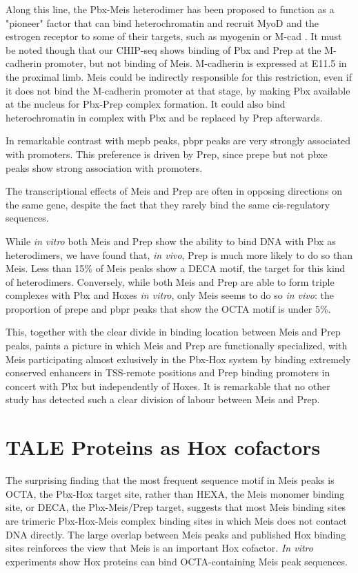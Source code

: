 Along this line, the Pbx-Meis heterodimer has been proposed to function as a "pioneer" factor that can bind heterochromatin and recruit MyoD and the estrogen receptor to some of their targets, such as myogenin or M-cad \parencite{Berkes2004, Magnani2011}. It must be noted though that our \ac{CHIP}-seq shows binding of Pbx and Prep at the M-cadherin promoter, but not binding of Meis. M-cadherin is expressed at E11.5 in the proximal limb. Meis could be indirectly responsible for this restriction, even if it does not bind the M-cadherin promoter at that stage, by making Pbx available at the nucleus for Pbx-Prep complex formation. It could also bind heterochromatin in complex with Pbx and be replaced by Prep afterwards.  %

In remarkable contrast with \ac{mepb} peaks, \ac{pbpr} peaks are very strongly associated with promoters. This preference is driven by Prep, since \ac{prepe} but not \ac{pbxe} peaks show strong association with promoters.  

The transcriptional effects of Meis and Prep are often in opposing directions on the same gene, despite the fact that they rarely bind the same cis-regulatory sequences.%

While \textit{in vitro} both Meis and Prep show the ability to bind DNA with Pbx as heterodimers, we have found that, \textit{in vivo}, Prep is much more likely to do so than Meis. Less than 15\% of Meis peaks show a \ac{DECA} motif, the target for this kind of heterodimers. Conversely, while both Meis and Prep are able to form triple complexes with Pbx and Hoxes \textit{in vitro}, only Meis seems to do so \textit{in vivo}: the proportion of \ac{prepe} and \ac{pbpr} peaks that show the \ac{OCTA} motif is under 5\%. 

This, together with the clear divide in binding location between Meis and Prep peaks, paints a picture in which Meis and Prep are functionally specialized, with Meis participating almost exlusively in the Pbx-Hox system by binding extremely conserved enhancers in \ac{TSS}-remote positions and Prep binding promoters in concert with Pbx but independently of Hoxes. It is remarkable that no other study has detected such a clear division of labour between Meis and Prep.

\section{TALE Proteins as Hox cofactors}

The surprising finding that the most frequent sequence motif in Meis peaks is \ac{OCTA}, the Pbx-Hox target site, rather than \ac{HEXA}, the Meis monomer binding site, or \ac{DECA}, the Pbx-Meis/Prep target, suggests that most Meis binding sites are trimeric Pbx-Hox-Meis complex binding sites in which Meis does not contact DNA directly. The large overlap between Meis peaks and published Hox binding sites reinforces the view that Meis is an important Hox cofactor. \textit{In vitro} experiments show Hox proteins can bind \ac{OCTA}-containing Meis peak sequences. 

